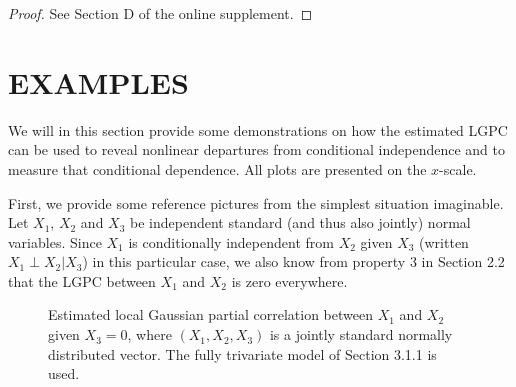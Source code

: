 \documentclass[
  12pt,
  letterpaper]{article}
\theoremstyle{definition}
\theoremstyle{definition}
\theoremstyle{definition}
\theoremstyle{remark}
\let\BeginKnitrBlock\begin \let\EndKnitrBlock\end
\begin{document}
\BeginKnitrBlock{proof}
{}See Section D of the online supplement.
\EndKnitrBlock{proof}

\hypertarget{chap:example}{%
\section{EXAMPLES}\label{chap:example}}

We will in this section provide some demonstrations on how the estimated LGPC can be used to reveal nonlinear departures from conditional independence and to measure that conditional dependence. All plots are presented on the \(x\)-scale.

First, we provide some reference pictures from the simplest situation imaginable. Let \(X_1\), \(X_2\) and \(X_3\) be independent standard (and thus also jointly) normal variables. Since \(X_1\) is conditionally independent from \(X_2\) given \(X_3\) (written \(X_1 \perp X_2 | X_3\)) in this particular case, we also know from property 3 in Section 2.2 that the LGPC between \(X_1\) and \(X_2\) is zero everywhere.

\begin{figure}
    \caption{Estimated local Gaussian partial correlation between $X_1$ and $X_2$ given $X_3 = 0$, where $(X_1, X_2, X_3)$ is a jointly standard normally distributed vector. The fully trivariate model of Section 3.1.1 is used.}\label{fig:gaussian-example-plots}
\end{figure}
\end{document}
